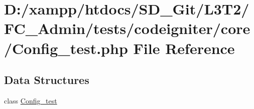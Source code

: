 \hypertarget{_admin_2tests_2codeigniter_2core_2_config__test_8php}{}\section{D\+:/xampp/htdocs/\+S\+D\+\_\+\+Git/\+L3\+T2/\+F\+C\+\_\+\+Admin/tests/codeigniter/core/\+Config\+\_\+test.php File Reference}
\label{_admin_2tests_2codeigniter_2core_2_config__test_8php}
\subsection*{Data Structures}
\begin{DoxyCompactItemize}
\item 
class \hyperlink{class_config__test}{Config\+\_\+test}
\end{DoxyCompactItemize}
